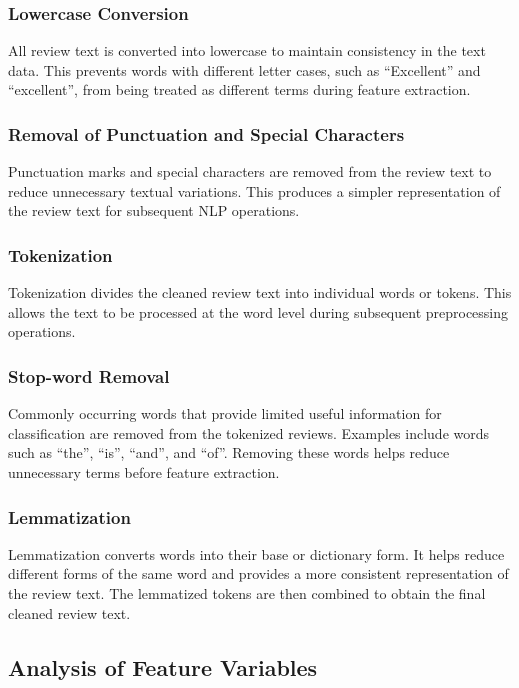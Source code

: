 \documentclass[12pt,a4paper]{report}
\begin{document}
\subsubsection*{Lowercase Conversion}

All review text is converted into lowercase to maintain consistency in the text data. This prevents words with different letter cases, such as ``Excellent'' and ``excellent'', from being treated as different terms during feature extraction.

\subsubsection*{Removal of Punctuation and Special Characters}

Punctuation marks and special characters are removed from the review text to reduce unnecessary textual variations. This produces a simpler representation of the review text for subsequent NLP operations.

\subsubsection*{Tokenization}

Tokenization divides the cleaned review text into individual words or tokens. This allows the text to be processed at the word level during subsequent preprocessing operations.

\subsubsection*{Stop-word Removal}

Commonly occurring words that provide limited useful information for classification are removed from the tokenized reviews. Examples include words such as ``the'', ``is'', ``and'', and ``of''. Removing these words helps reduce unnecessary terms before feature extraction.

\subsubsection*{Lemmatization}

Lemmatization converts words into their base or dictionary form. It helps reduce different forms of the same word and provides a more consistent representation of the review text. The lemmatized tokens are then combined to obtain the final cleaned review text.


\subsection{Analysis of Feature Variables}
\end{document}
